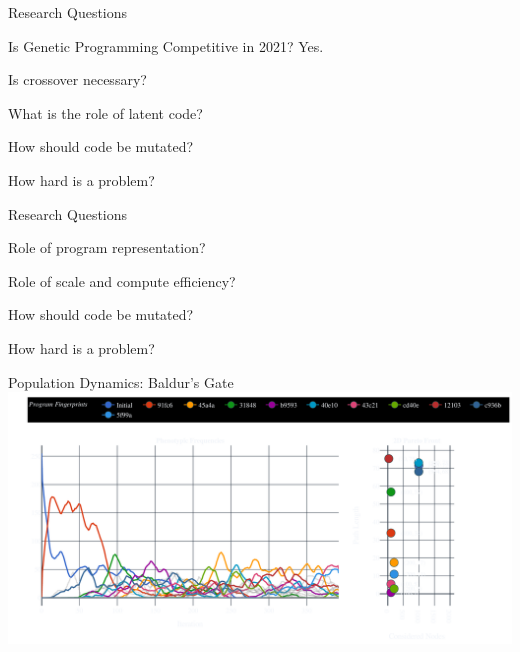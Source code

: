 \documentclass[aspectratio=169]{beamer}
\begin{document}
\begin{frame}{Research Questions}
  \begin{vfilleditems}
    \item {\Huge Is Genetic Programming Competitive in 2021? {\color{pureminimalistic@text@red} Yes.}}
    {\color{grey}
    \item {\Huge Is crossover necessary?}
    \item {\Huge What is the role of latent code?}
    \item {\Huge How should code be mutated?}
    \item {\Huge How hard is a problem?}
    }
  \end{vfilleditems}
\end{frame}

\begin{frame}{Research Questions}
  \begin{vfilleditems}
    \item {\Huge Role of program representation?}
    \item {\Huge Role of scale and compute efficiency?}
    \item {\Huge How should code be mutated?}
    \item {\Huge How hard is a problem?}
  \end{vfilleditems}
\end{frame}

\begin{frame}{Population Dynamics: Baldur's Gate}
    \includegraphics[width=1.0\linewidth, keepaspectratio]{figures/baldurs_pheno_50.pdf}
\end{frame}
\end{document}
